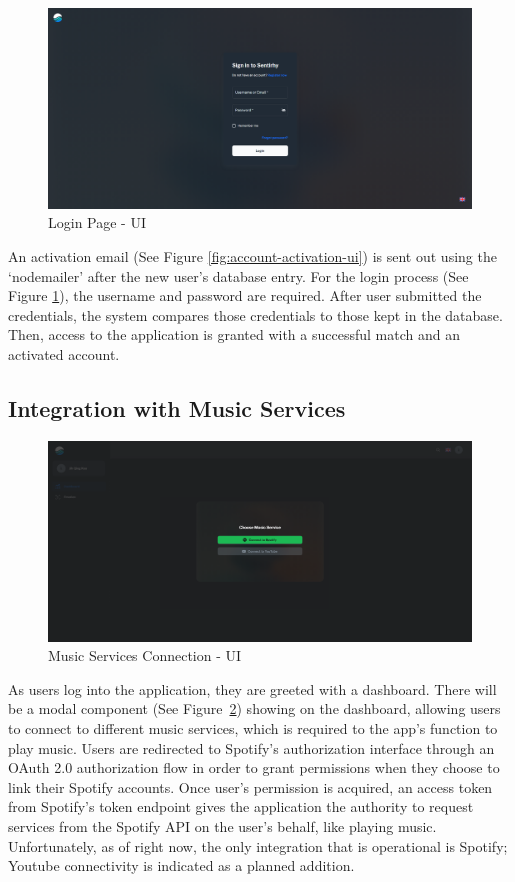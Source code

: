 \begin{figure}[ht!]
    \centering
    \includegraphics[width=14cm]{Images/login-ui.png}
    \caption{Login Page - UI}
    \label{fig:login-page-ui}
\end{figure}
\indent An activation email (See Figure \ref{fig:account-activation-ui}) is sent out using the `nodemailer' after the new user's database entry.
For the login process (See Figure \ref{fig:login-page-ui}), the username and password are required.
After user submitted the credentials, the system compares those credentials to those kept in the database. 
Then, access to the application is granted with a successful match and an activated account.
\\
\subsection{Integration with Music Services}
\begin{figure}[H]
    \centering
    \includegraphics[width=14cm]{Images/connect-api.png}
    \caption{Music Services Connection - UI}
    \label{fig:music-service}
\end{figure}
As users log into the application, they are greeted with a dashboard.
There will be a modal component (See Figure~\ref{fig:music-service}) showing on the dashboard, allowing users to connect to different music services, which is required to the app's function to play music.
Users are redirected to Spotify's authorization interface through an OAuth 2.0 authorization flow in order to grant permissions when they choose to link their Spotify accounts.
Once user's permission is acquired, an access token from Spotify's token endpoint gives the application the authority to request services from the Spotify API on the user's behalf, like playing music.
Unfortunately, as of right now, the only integration that is operational is Spotify; Youtube connectivity is indicated as a planned addition.
\\
